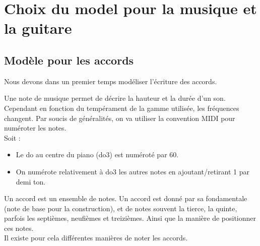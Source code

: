 \section{Choix du model pour la musique et la guitare}

\subsection{Modèle pour les accords}

Nous devons dans un premier temps modéliser l'écriture des accords.

\begin{defi}
  Une note de musique permet de décrire la hauteur et la durée d'un son. Cependant en
  fonction du tempérament de la gamme utilisée, les fréquences changent.
  Par soucis de généralités, on va utiliser la convention MIDI \cite{bMIDI} 
  pour numéroter les notes.\\
  Soit :
  \begin{itemize}
    \item Le do au centre du piano (do3) est numéroté par 60.
    \item On numérote relativement à do3 les autres notes en ajoutant/retirant 1 par
      demi ton.
  \end{itemize}
\end{defi}

\begin{defi}[Accord]
  Un accord est un ensemble de notes.
  Un accord est donné par sa fondamentale (note de base pour la construction),
  et de notes souvent la tierce, la quinte, parfois les septièmes, neufièmes et
  treizièmes. Ainsi que la manière de positionner ces notes.\\
  Il existe pour cela différentes manières de noter les accords.
\end{defi}

